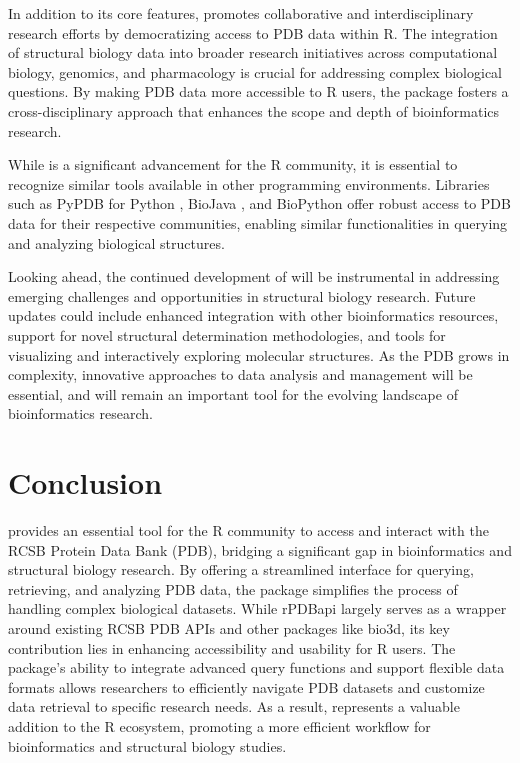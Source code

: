 In addition to its core features,  promotes collaborative and interdisciplinary research efforts by democratizing access to PDB data within R. The integration of structural biology data into broader research initiatives across computational biology, genomics, and pharmacology is crucial for addressing complex biological questions. By making PDB data more accessible to R users, the package fosters a cross-disciplinary approach that enhances the scope and depth of bioinformatics research.

While  is a significant advancement for the R community, it is essential to recognize similar tools available in other programming environments. Libraries such as PyPDB for Python \citep{gilpin2016pypdb}, BioJava \citep{lafita2019biojava}, and BioPython \citep{cock2009biopython} offer robust access to PDB data for their respective communities, enabling similar functionalities in querying and analyzing biological structures.

Looking ahead, the continued development of  will be instrumental in addressing emerging challenges and opportunities in structural biology research. Future updates could include enhanced integration with other bioinformatics resources, support for novel structural determination methodologies, and tools for visualizing and interactively exploring molecular structures. As the PDB grows in complexity, innovative approaches to data analysis and management will be essential, and  will remain an important tool for the evolving landscape of bioinformatics research.

\section{Conclusion}\label{conclusion}

 provides an essential tool for the R community to access and interact with the RCSB Protein Data Bank (PDB), bridging a significant gap in bioinformatics and structural biology research. By offering a streamlined interface for querying, retrieving, and analyzing PDB data, the package simplifies the process of handling complex biological datasets. While rPDBapi largely serves as a wrapper around existing RCSB PDB APIs and other packages like bio3d, its key contribution lies in enhancing accessibility and usability for R users. The package's ability to integrate advanced query functions and support flexible data formats allows researchers to efficiently navigate PDB datasets and customize data retrieval to specific research needs. As a result,  represents a valuable addition to the R ecosystem, promoting a more efficient workflow for bioinformatics and structural biology studies.

